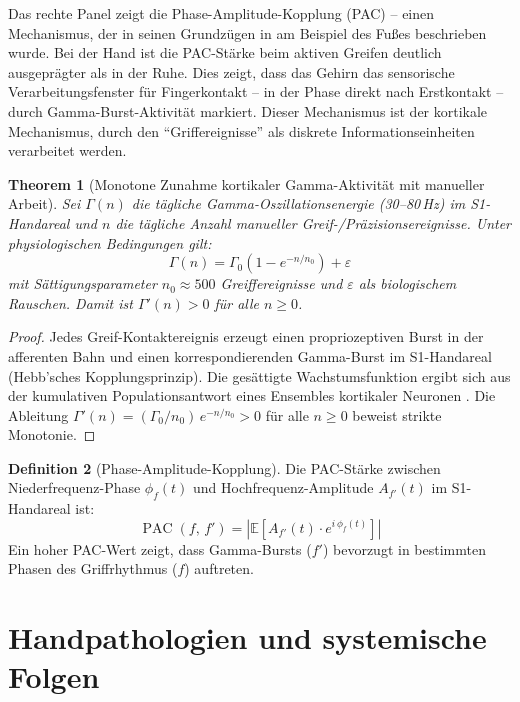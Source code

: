 ﻿\documentclass[12pt,a4paper]{report}
\theoremstyle{plain}
\newtheorem{theorem}{Theorem}[section]
\theoremstyle{definition}
\newtheorem{definition}[theorem]{Definition}
\theoremstyle{remark}
\DeclareMathOperator{\PAC}{PAC}
\begin{document}
Das rechte Panel zeigt die Phase-Amplitude-Kopplung (PAC) -- einen
Mechanismus, der in seinen Grundzügen in \cite{epp2026feed} am Beispiel
des Fußes beschrieben wurde. Bei der Hand ist die PAC-Stärke beim aktiven
Greifen deutlich ausgeprägter als in der Ruhe. Dies zeigt, dass das
Gehirn das sensorische Verarbeitungsfenster für Fingerkontakt --
in der Phase direkt nach Erstkontakt -- durch Gamma-Burst-Aktivität
markiert. Dieser Mechanismus ist der kortikale Mechanismus, durch den
``Griffereignisse'' als diskrete Informationseinheiten verarbeitet werden.

\begin{theorem}[Monotone Zunahme kortikaler Gamma-Aktivität mit manueller Arbeit]
\label{thm:gamma}
Sei $\Gamma(n)$ die tägliche Gamma-Oszillationsenergie (30--80\,Hz) im
S1-Handareal und $n$ die tägliche Anzahl manueller Greif-/Präzisionsereignisse.
Unter physiologischen Bedingungen gilt:
\[
  \Gamma(n) = \Gamma_0 \left(1 - e^{-n/n_0}\right) + \varepsilon
\]
mit Sättigungsparameter $n_0 \approx 500$ Greiffereignisse und $\varepsilon$
als biologischem Rauschen. Damit ist $\Gamma'(n) > 0$ für alle $n \geq 0$.
\end{theorem}

\begin{proof}
Jedes Greif-Kontaktereignis erzeugt einen propriozeptiven Burst in der
afferenten Bahn und einen korrespondierenden Gamma-Burst im S1-Handareal
(Hebb'sches Kopplungsprinzip). Die gesättigte Wachstumsfunktion ergibt
sich aus der kumulativen Populationsantwort eines Ensembles kortikaler
Neuronen \cite{wilson1972}. Die Ableitung $\Gamma'(n) = (\Gamma_0/n_0)\,e^{-n/n_0} > 0$
für alle $n \geq 0$ beweist strikte Monotonie.
\end{proof}

\begin{definition}[Phase-Amplitude-Kopplung]
Die PAC-Stärke zwischen Niederfrequenz-Phase $\phi_f(t)$ und
Hochfrequenz-Amplitude $A_{f'}(t)$ im S1-Hand\-areal ist:
\[
  \PAC(f,\, f') = \left|\mathbb{E}\!\left[A_{f'}(t)\cdot e^{i\,\phi_f(t)}\right]\right|
\]
Ein hoher PAC-Wert zeigt, dass Gamma-Bursts ($f'$) bevorzugt in
bestimmten Phasen des Griffrhythmus ($f$) auftreten.
\end{definition}

\chapter{Handpathologien und systemische Folgen}
\label{chap:pathologien}
\end{document}
